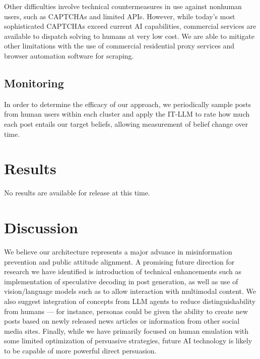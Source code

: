 \documentclass[11pt]{article}
\begin{document}
Other difficulties involve technical countermeasures in use against nonhuman users, such as CAPTCHAs and limited APIs. However, while today's most sophisticated CAPTCHAs exceed current AI capabilities, commercial services are available to dispatch solving to humans at very low cost. We are able to mitigate other limitations with the use of commercial residential proxy services and browser automation software for scraping.

\subsection{Monitoring}

In order to determine the efficacy of our approach, we periodically sample posts from human users within each cluster and apply the IT-LLM to rate how much each post entails our target beliefs, allowing measurement of belief change over time.

\section{Results}

No results are available for release at this time.

\section{Discussion}

We believe our architecture represents a major advance in misinformation prevention and public attitude alignment. A promising future direction for research we have identified is introduction of technical enhancements such as implementation of speculative decoding in post generation, as well as use of vision/language models such as \cite{liu2023improved} to allow interaction with multimodal content. We also suggest integration of concepts from LLM agents to reduce distinguishability from humans --- for instance, personas could be given the ability to create new posts based on newly released news articles or information from other social media sites. Finally, while we have primarily focused on human emulation with some limited optimization of persuasive strategies, future AI technology is likely to be capable of more powerful direct persuasion.


\end{document}
